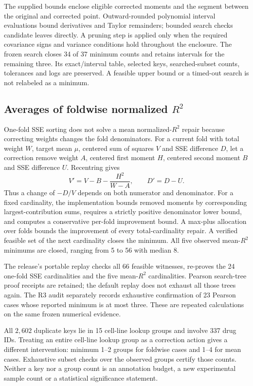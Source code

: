 The supplied bounds enclose eligible corrected moments and the segment between the original and corrected point. Outward-rounded polynomial interval evaluations bound derivatives and Taylor remainders; bounded search checks candidate leaves directly. A pruning step is applied only when the required covariance signs and variance conditions hold throughout the enclosure. The frozen search closes 34 of 37 minimum counts and retains intervals for the remaining three. Its exact/interval table, selected keys, searched-subset counts, tolerances and logs are preserved. A feasible upper bound or a timed-out search is not relabeled as a minimum.



\subsection{Averages of foldwise normalized $R^2$}
One-fold SSE sorting does not solve a mean normalized-$R^2$ repair because correcting weights changes the fold denominators. For a current fold with total weight $W$, target mean $\mu$, centered sum of squares $V$ and SSE difference $D$, let a correction remove weight $A$, centered first moment $H$, centered second moment $B$ and SSE difference $U$. Recentring gives
\[
V'=V-B-\frac{H^2}{W-A},\qquad D'=D-U.
\]
Thus a change of $-D/V$ depends on both numerator and denominator. For a fixed cardinality, the implementation bounds removed moments by corresponding largest-contribution sums, requires a strictly positive denominator lower bound, and computes a conservative per-fold improvement bound. A max-plus allocation over folds bounds the improvement of every total-cardinality repair. A verified feasible set of the next cardinality closes the minimum. All five observed mean-$R^2$ minimums are closed, ranging from 5 to 56 with median 8.

The release's portable replay checks all 66 feasible witnesses, re-proves the 24 one-fold SSE cardinalities and the five mean-$R^2$ cardinalities. Pearson search-tree proof receipts are retained; the default replay does not exhaust all those trees again. The R3 audit separately records exhaustive confirmation of 23 Pearson cases whose reported minimum is at most three. These are repeated calculations on the same frozen numerical evidence.



All $2{,}602$ duplicate keys lie in 15 cell-line lookup groups and involve 337 drug IDs. Treating an entire cell-line lookup group as a correction action gives a different intervention: minimum 1--2 groups for foldwise cases and 1--4 for mean cases. Exhaustive subset checks over the observed groups certify those counts. Neither a key nor a group count is an annotation budget, a new experimental sample count or a statistical significance statement.

